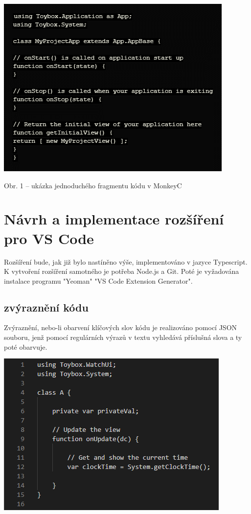 \documentclass[czech,master,dept460,male,cpp,cpdeclaration]{diploma}
\begin{document}
\includegraphics{code_snippet}

	Obr. 1 – ukázka jednoduchého fragmentu kódu v MonkeyC

\section{Návrh a implementace rozšíření pro VS Code}
Rozšíření bude, jak již bylo nastíněno výše, implementováno v jazyce Typescript. 
K vytvoření rozšíření samotného je potřeba Node.js a Git. Poté je vyžadována instalace programu "Yeoman" "VS Code Extension Generator".

\subsection{zvýraznění kódu}

Zvýraznění, nebo-li obarvení klíčových slov kódu je realizováno pomocí JSON souboru, jenž pomocí regulárních výrazů v textu vyhledává příslušná slova a ty poté obarvuje.

\includegraphics[]{uncolored_code}
\end{document}
